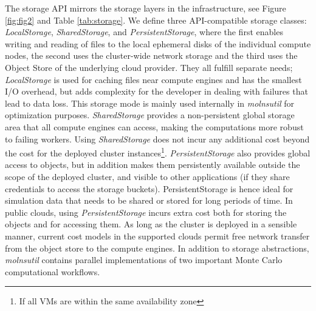 \documentclass[final,leqno,onefignum,onetabnum]{siamltex1213}
\begin{document}
The storage API mirrors the storage layers in the infrastructure, see Figure \ref{fig:fig2} and Table \ref{tab:storage}. We define three API-compatible storage classes: \emph{LocalStorage}, \emph{SharedStorage}, and \emph{PersistentStorage}, where the first enables writing and reading of files to the local ephemeral disks of the individual compute nodes, the second uses the cluster-wide network storage and the third uses the Object Store of the underlying cloud provider. They all fulfill separate needs; \emph{LocalStorage} is used for caching files near compute engines and has the smallest I/O overhead, but adds complexity for the developer in dealing with failures that lead to data loss. This storage mode is mainly used internally in \emph{molnsutil} for optimization purposes. \emph{SharedStorage} provides a non-persistent global storage area that all compute engines can access, making  the computations more robust to failing workers. Using \emph{SharedStorage} does not incur any additional cost beyond the cost for the deployed cluster instances\footnote{If all VMs are within the same availability zone}. \emph{PersistentStorage} also provides global access to objects, but in addition makes them persistently available outside the scope of the deployed cluster, and visible to other applications (if they share credentials to  access the storage buckets). {PersistentStorage} is hence ideal for simulation data that needs to be shared or stored for long periods of time. In public clouds, using \emph{PersistentStorage} incurs extra cost both for storing the objects and for accessing them. As long as the cluster is deployed in a sensible manner, current cost models in the supported clouds permit free network transfer from the object store to the compute engines. In addition to storage abstractions, \emph{molnsutil} contains parallel implementations of two important Monte Carlo computational workflows. 
\end{document}
